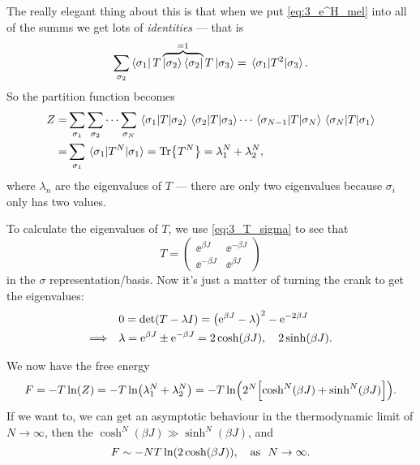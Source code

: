 \documentclass[11pt,letter, swedish, english
]{article}
\begin{document}
The really elegant thing about this is that when we put
\eqref{eq:3_e^H_mel} into all of the summs we get lots of
\emph{identities} --- that is 
\begin{equation}
\sum_{\sigma_2}\bra{\sigma_1}{T}
\overbrace{\ket{\sigma_2}\bra{\sigma_2}}^{=1}
{T}\ket{\sigma_3}
=\mel{\sigma_1}{T^2}{\sigma_3}.
\end{equation}
So the partition function becomes
\begin{equation}
\begin{aligned}
Z=&\sum_{\sigma_1}\sum_{\sigma_2}\cdots\sum_{\sigma_N}
\mel{\sigma_1}{T}{\sigma_2}\mel{\sigma_2}{T}{\sigma_3}
\cdots\mel{\sigma_{N-1}}{T}{\sigma_N}\mel{\sigma_{N}}{T}{\sigma_1}\\
=&\sum_{\sigma_1}\mel{\sigma_1}{T^N}{\sigma_1}
=\Tr{T^N}=\lambda_1^N+\lambda_2^N,
\end{aligned}
\end{equation}
where $\lambda_n$ are the eigenvalues of $T$ --- there are only two
eigenvalues because $\sigma_i$ only has two values. 

To calculate the eigenvalues of $T$, we use \eqref{eq:3_T_sigma} to
see that
\begin{equation}
T=\begin{pmatrix}
\ee^{\beta J} &\ee^{-\beta J}\\
\ee^{-\beta J} & \ee^{\beta J}
\end{pmatrix}
\end{equation}
in the $\sigma$ representation/basis. Now it's just a matter of
turning the crank to get the eigenvalues:
\begin{equation}
\begin{aligned}
&0=\det(T-\lambda I)=\qty(\ee^{\beta J}-\lambda)^2-\ee^{-2\beta J}\\
\Longrightarrow\quad&
\lambda=\ee^{\beta J}\pm\ee^{-\beta J}
=2\cosh(\beta J)\qcomma 2\sinh(\beta J). 
\end{aligned}
\end{equation}

We now have the free energy
\begin{equation}
F=-T\ln(Z)=-T\ln(\lambda_1^N+\lambda_2^N)
=-T\ln(2^N\qty[\cosh^N(\beta J) + \sinh^N(\beta J)]).
\end{equation}
If we want to, we can get an asymptotic behaviour in the thermodynamic
limit of $N\to\infty$, then the $\cosh^N(\beta J)\gg\sinh^N(\beta
J)$, and
\begin{equation}
F\sim-NT\ln(2\cosh(\beta J))
\qcomma \text{as }\ N\to\infty.
\end{equation}
\end{document}
